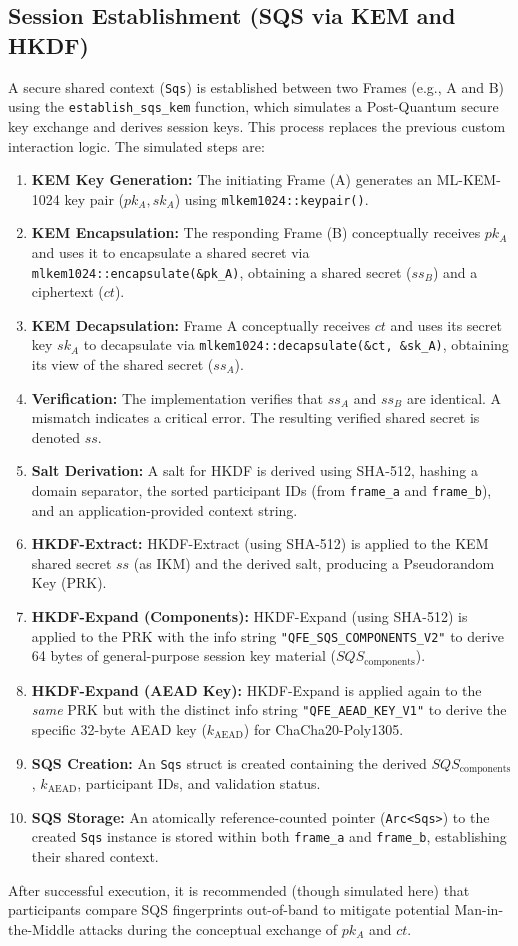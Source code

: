 \documentclass[11pt]{article}
\newcommand{\SQScomp}{SQS_{\text{components}}} %
\begin{document}
	\subsection{Session Establishment (SQS via KEM and HKDF)} \label{sec:sqs_establishment}
	A secure shared context (\texttt{Sqs}) is established between two Frames (e.g., A and B) using the \texttt{establish\_sqs\_kem} function, which simulates a Post-Quantum secure key exchange and derives session keys. This process replaces the previous custom interaction logic. The simulated steps are:
	\begin{enumerate}
		\item \textbf{KEM Key Generation:} The initiating Frame (A) generates an ML-KEM-1024 key pair ($pk_A, sk_A$) using \texttt{mlkem1024::keypair()}.
		\item \textbf{KEM Encapsulation:} The responding Frame (B) conceptually receives $pk_A$ and uses it to encapsulate a shared secret via \texttt{mlkem1024::encapsulate(\&pk\_A)}, obtaining a shared secret ($ss_B$) and a ciphertext ($ct$).
		\item \textbf{KEM Decapsulation:} Frame A conceptually receives $ct$ and uses its secret key $sk_A$ to decapsulate via \texttt{mlkem1024::decapsulate(\&ct, \&sk\_A)}, obtaining its view of the shared secret ($ss_A$).
		\item \textbf{Verification:} The implementation verifies that $ss_A$ and $ss_B$ are identical. A mismatch indicates a critical error. The resulting verified shared secret is denoted $ss$.
		\item \textbf{Salt Derivation:} A salt for HKDF is derived using SHA-512, hashing a domain separator, the sorted participant IDs (from \texttt{frame\_a} and \texttt{frame\_b}), and an application-provided context string.
		\item \textbf{HKDF-Extract:} HKDF-Extract (using SHA-512) is applied to the KEM shared secret $ss$ (as IKM) and the derived salt, producing a Pseudorandom Key (PRK).
		\item \textbf{HKDF-Expand (Components):} HKDF-Expand (using SHA-512) is applied to the PRK with the info string \texttt{"QFE\_SQS\_COMPONENTS\_V2"} to derive 64 bytes of general-purpose session key material ($\SQScomp$).
		\item \textbf{HKDF-Expand (AEAD Key):} HKDF-Expand is applied again to the \emph{same} PRK but with the distinct info string \texttt{"QFE\_AEAD\_KEY\_V1"} to derive the specific 32-byte AEAD key ($k_{\text{AEAD}}$) for ChaCha20-Poly1305.
		\item \textbf{SQS Creation:} An \texttt{Sqs} struct is created containing the derived $\SQScomp$, $k_{\text{AEAD}}$, participant IDs, and validation status.
		\item \textbf{SQS Storage:} An atomically reference-counted pointer (\texttt{Arc<Sqs>}) to the created \texttt{Sqs} instance is stored within both \texttt{frame\_a} and \texttt{frame\_b}, establishing their shared context.
	\end{enumerate}
	After successful execution, it is recommended (though simulated here) that participants compare SQS fingerprints out-of-band to mitigate potential Man-in-the-Middle attacks during the conceptual exchange of $pk_A$ and $ct$.
	
\end{document}
